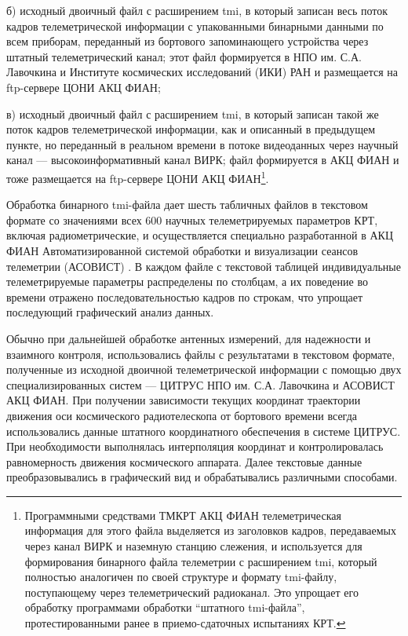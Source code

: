 б) исходный двоичный файл с расширением tmi, в который записан
весь поток кадров телеметрической информации с упакованными бинарными
данными по всем приборам, переданный из бортового запоминающего
устройства через штатный телеметрический канал;
этот файл формируется в НПО им. С.А. Лавочкина и
Институте космических исследований (ИКИ) РАН и
размещается на ftp-сервере ЦОНИ АКЦ ФИАН;

в) исходный двоичный файл с расширением tmi, в который записан
такой же поток кадров телеметрической информации, как и описанный в
предыдущем пункте, но переданный в реальном времени в потоке видеоданных
через научный канал --- высокоинформативный канал ВИРК;
файл формируется в АКЦ ФИАН и тоже размещается на ftp-сервере
ЦОНИ АКЦ ФИАН\footnote
{
Программными средствами ТМКРТ АКЦ ФИАН телеметрическая информация
для этого файла выделяется из заголовков кадров, передаваемых
через канал ВИРК и наземную станцию слежения, и используется для формирования
бинарного файла телеметрии с расширением tmi, который полностью аналогичен
по своей структуре и формату tmi-файлу, поступающему через телеметрический
радиоканал. Это упрощает его обработку программами обработки
``штатного tmi-файла'', протестированными ранее в приемо-сдаточных
испытаниях КРТ.
}.

Обработка бинарного tmi-файла дает шесть табличных файлов в текстовом формате со значениями всех 600
научных телеметрируемых параметров КРТ, включая радиометрические, и осуществляется специально
разработанной в АКЦ ФИАН Автоматизированной системой обработки и визуализации сеансов телеметрии
(АСОВИСТ)  \cite{KovalevVAK_2010}. В каждом файле с текстовой таблицей индивидуальные
телеметрируемые параметры распределены по столбцам, а их поведение во времени отражено
последовательностью кадров по строкам, что упрощает последующий графический анализ данных.

Обычно при дальнейшей обработке антенных измерений, для надежности и взаимного контроля,
использовались файлы с результатами в текстовом формате, полученные из исходной двоичной
телеметрической информации с помощью двух специализированных систем --- ЦИТРУС НПО им. С.А.
Лавочкина и АСОВИСТ АКЦ ФИАН. При получении зависимости текущих координат траектории движения оси
космического радиотелескопа от бортового времени всегда использовались данные штатного координатного
обеспечения в системе ЦИТРУС. При необходимости выполнялась интерполяция координат и
контролировалась равномерность движения космического аппарата. Далее текстовые данные
преобразовывались в графический вид и обрабатывались различными способами.

